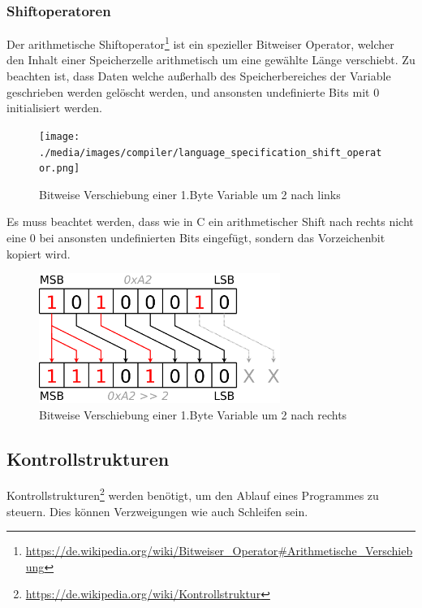 \newpage
\subsubsection{Shiftoperatoren}

Der arithmetische Shiftoperator\footnote{\url{https://de.wikipedia.org/wiki/Bitweiser_Operator\#Arithmetische_Verschiebung}} ist ein spezieller Bitweiser Operator, welcher den Inhalt einer Speicherzelle arithmetisch um eine gew\"ahlte L\"ange verschiebt. Zu beachten ist, dass Daten welche außerhalb des Speicherbereiches der Variable geschrieben werden gel\"oscht werden, und ansonsten undefinierte Bits mit 0 initialisiert werden.

\begin{figure}[h]
\centering
\texttt{[image: ./media/images/compiler/language\_specification\_shift\_operator.png]}
\caption{Bitweise Verschiebung einer 1.Byte Variable um 2 nach links}
\label{language_specification_shift_operator}
\end{figure}

Es muss beachtet werden, dass wie in C ein arithmetischer Shift nach rechts nicht eine 0 bei ansonsten undefinierten Bits eingef\"ugt, sondern das Vorzeichenbit kopiert wird.

\begin{figure}[h]
\centering
\includegraphics[width=0.7\textwidth]{./media/images/compiler/language_specification_shift_operator_right.png}
\caption{Bitweise Verschiebung einer 1.Byte Variable um 2 nach rechts}
\label{language_specification_shift_operator_right}
\end{figure}

\newpage
\subsection{Kontrollstrukturen}

Kontrollstrukturen\footnote{\url{https://de.wikipedia.org/wiki/Kontrollstruktur} } werden ben\"otigt, um den Ablauf eines Programmes zu steuern. Dies k\"onnen Verzweigungen wie auch Schleifen sein.

